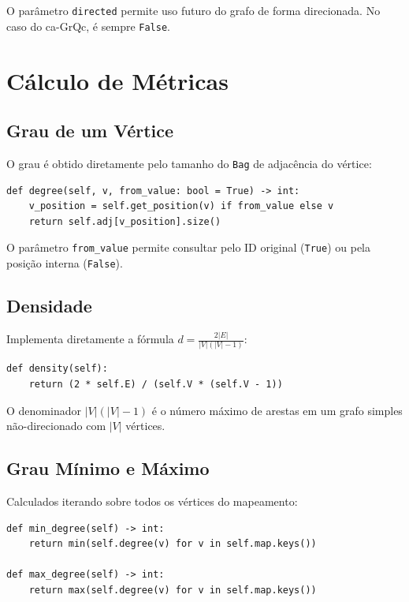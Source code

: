 \documentclass[12pt,a4paper]{article}
\begin{document}
O parâmetro \texttt{directed} permite uso futuro do grafo de forma direcionada. No caso do ca-GrQc, é sempre \texttt{False}.

\section{Cálculo de Métricas}

\subsection{Grau de um Vértice}

O grau é obtido diretamente pelo tamanho do \texttt{Bag} de adjacência do vértice:

\begin{lstlisting}
def degree(self, v, from_value: bool = True) -> int:
    v_position = self.get_position(v) if from_value else v
    return self.adj[v_position].size()
\end{lstlisting}

O parâmetro \texttt{from\_value} permite consultar pelo ID original (\texttt{True}) ou pela posição interna (\texttt{False}).

\subsection{Densidade}

Implementa diretamente a fórmula $d = \frac{2|E|}{|V|(|V|-1)}$:

\begin{lstlisting}
def density(self):
    return (2 * self.E) / (self.V * (self.V - 1))
\end{lstlisting}

O denominador $|V|(|V|-1)$ é o número máximo de arestas em um grafo simples não-direcionado com $|V|$ vértices.

\subsection{Grau Mínimo e Máximo}

Calculados iterando sobre todos os vértices do mapeamento:

\begin{lstlisting}
def min_degree(self) -> int:
    return min(self.degree(v) for v in self.map.keys())

def max_degree(self) -> int:
    return max(self.degree(v) for v in self.map.keys())
\end{lstlisting}
\end{document}
